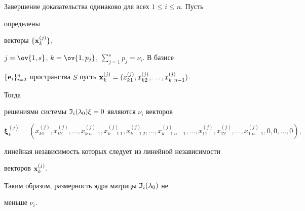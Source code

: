 \begin{pf}
 


Завершение доказательства одинаково для всех $1\le i\le n$. Пусть 


определены 


векторы $\{\bold x^{(j)}_k\}$, 


$j=\ov{1,s}$, $k=\ov{1,p_j}$, $\sum\limits^s_{j=1}p_j=\nu_i$. В базисе 


$\{\bold e_i\}^n_{i=2}$ пространства $S$ пусть $\bold 


x^{(j)}_{k}=(x^{(j)}_{k1},x^{(j)}_{k2},\dotsc, x^{(j)}_{k\ n-1})$. 


Тогда 


решениями системы $\frak I_i(\lambda_0)\xi=0$ являются $\nu_i$ векторов 


$$ 


\boldsymbol\xi^{(j)}_{k}=(x^{(j)}_{k1},x^{(j)}_{k2},\dotsc, 


x^{(j)}_{k\ n-1},x^{(j)}_{k-1\ 1},x^{(j)}_{k-1\ 2},\dotsc, 


x^{(j)}_{k-1\ n-1},\dotsc,x^{(j)}_{11},x^{(j)}_{12},\dotsc, 


x^{(j)}_{1\ n-1},0,0,\dotsc,0), 


$$ 


линейная независимость которых следует из линейной независимости 


векторов $\bold x^{(j)}_{k}$. 


Таким образом, размерность ядра матрицы $\frak I_i(\lambda_0)$ не 


меньше $\nu_i$. 


\end{pf} 


 


